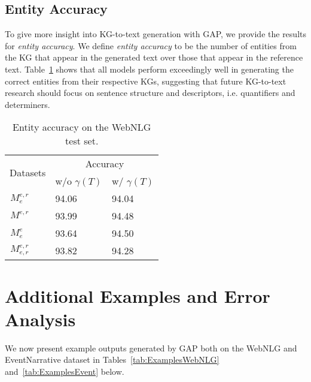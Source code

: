 \documentclass[11pt]{article}
\begin{document}
\subsection{Entity Accuracy}
To give more insight into KG-to-text generation with GAP, we provide the results for \textit{entity accuracy}. We define \textit{entity accuracy} to be the number of entities from the KG that appear in the generated text over those that appear in the reference text. Table~\ref{tab:entacc} shows that all models perform exceedingly well in generating the correct entities from their respective KGs, suggesting that future KG-to-text research should focus on sentence structure and descriptors, i.e. quantifiers and determiners. 

\begin{table}[H]
\centering
\begin{tabular}{lll}
\hline
\multicolumn{1}{c}{\multirow{2}{*}{Datasets}} & \multicolumn{2}{c}{Accuracy}         \\ \cline{2-3} 
\multicolumn{1}{c}{}                          & w/o $\gamma(T)$ & w/ $\gamma(T)$ \\ \hline
$ {}^{}_{}M^{e,r}_{e} $                                             & 94.06             & 94.04            \\ \hline
$ {}^{}_{}M^{e,r}_{} $                                             & 93.99             & 94.48            \\ \hline
$ {}^{}_{}M^{e}_{e} $                                            & 93.64             & 94.50            \\ \hline
$ {}^{}_{}M^{e,r}_{e,r} $                                             & 93.82             & 94.28            \\ \hline
\end{tabular}
\caption{\label{tab:entacc} Entity accuracy on the WebNLG test set.}
\end{table}

\section{Additional Examples and Error Analysis}
\label{sec:generationexamples}
We now present example outputs generated by GAP both on the WebNLG and EventNarrative dataset in Tables~\ref{tab:ExamplesWebNLG} and~\ref{tab:ExamplesEvent} below. 
\end{document}
